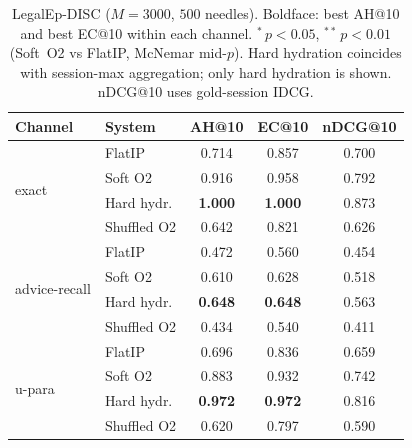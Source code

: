 \documentclass[preprint,12pt,authoryear]{elsarticle}
\newcommand{\compacttab}{\setlength{\tabcolsep}{4.5pt}\renewcommand{\arraystretch}{1.05}}
\begin{document}
\begin{table}[H]
\centering
\caption{LegalEp-DISC ($M{=}3000$, $500$ needles). Boldface: best AH@10 and best EC@10 within each channel. ${}^{*}\,p{<}0.05$, ${}^{**}\,p{<}0.01$ (Soft~O2 vs FlatIP, McNemar mid-$p$). Hard hydration coincides with session-max aggregation; only hard hydration is shown. nDCG@10 uses gold-session IDCG.}
\label{tab:disc_main}
\compacttab\footnotesize
\begin{tabular}{@{}llccc@{}}
\toprule
\textbf{Channel} & \textbf{System} & \textbf{AH@10} & \textbf{EC@10} & \textbf{nDCG@10} \\
\midrule
\multirow{4}{*}{exact}
 & FlatIP & 0.714 & 0.857 & 0.700 \\
 & Soft O2 & 0.916 & 0.958 & 0.792 \\
 & Hard hydr. & \textbf{1.000} & \textbf{1.000} & 0.873 \\
 & Shuffled O2 & 0.642 & 0.821 & 0.626 \\
\midrule
\multirow{4}{*}{advice-recall}
 & FlatIP & 0.472 & 0.560 & 0.454 \\
 & Soft O2 & 0.610 & 0.628 & 0.518 \\
 & Hard hydr. & \textbf{0.648} & \textbf{0.648} & 0.563 \\
 & Shuffled O2 & 0.434 & 0.540 & 0.411 \\
\midrule
\multirow{4}{*}{u-para}
 & FlatIP & 0.696 & 0.836 & 0.659 \\
 & Soft O2 & 0.883 & 0.932 & 0.742 \\
 & Hard hydr. & \textbf{0.972} & \textbf{0.972} & 0.816 \\
 & Shuffled O2 & 0.620 & 0.797 & 0.590 \\
\bottomrule
\end{tabular}
\end{table}
\end{document}
